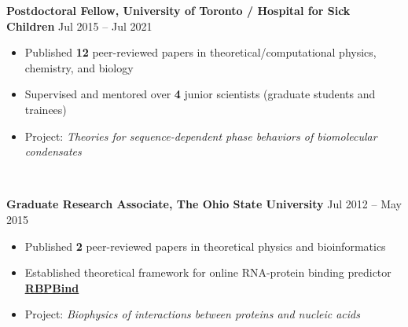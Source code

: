 \documentclass[11pt,letterpaper, sans]{article}
\begin{document}
\begin{flushleft}
{\bf Postdoctoral Fellow, 
University of Toronto / Hospital for Sick Children} 
\hfill Jul 2015 -- Jul 2021  %
\vspace{-0.5em}\\
\begin{itemize}[leftmargin=*]\itemsep-0.2em
\item Published {\bf 12} peer-reviewed papers in theoretical/computational physics, chemistry, and biology
\item Supervised and mentored over {\bf 4} junior scientists (graduate students and trainees)
\item Project: {\it Theories for sequence-dependent phase behaviors of biomolecular condensates}
\end{itemize}

\vspace{-1.5em}\ \

{\bf Graduate Research Associate, %
The Ohio State University}  \hfill Jul 2012 -- May 2015
\vspace{-0.5em} \\
\begin{itemize}[leftmargin=*]\itemsep-0.2em
\item Published {\bf 2} peer-reviewed papers in theoretical physics and bioinformatics
\item Established theoretical framework for online RNA-protein binding predictor \href{http://bioserv.mps.ohio-state.edu/RBPBind/}{\underline{\bf RBPBind}}
\item Project: {\it Biophysics of interactions between proteins and nucleic acids}
\end{itemize}


\end{flushleft}
\end{document}
